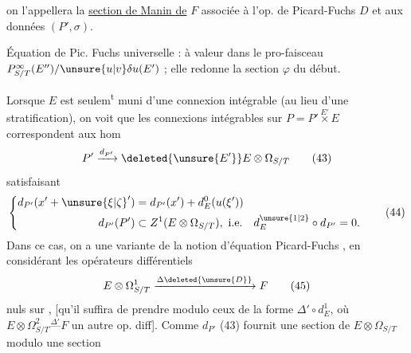 on l'appellera la \uline{section de Manin de} $F$ associée à l'op. de Picard-Fuchs $D$ et aux données $(P',\sigma)$.

Équation de Pic. Fuchs universelle : à valeur dans le pro-faisceau $P^\infty_{S/T}(E'')/\unsure{u|v}\delta u(E')$ ; elle redonne la section $\varphi$ du début.

Lorsque $E$ est seulem\textsuperscript{t} muni d'une connexion intégrable   (au lieu d'une stratification), on voit que les connexions intégrables sur $P=P'\mathbin{\overset{E'}{\times}}E$ correspondent aux hom
\[
 P'\xrightarrow{d_{P'}}\deleted{\unsure{E'}}E\otimes\Omega_{S/T} \tag*{(43)}
\]
satisfaisant
\[
 \left\{\begin{aligned}
 d_{P'}(x'+{\unsure{\xi|\zeta}}')&=d_{P'}(x')+d^0_E(u(\xi'))\\
 d_{P'}(P')&\subset Z^1(E\otimes\Omega_{S/T}),\ \text{i.e.}\quad d^{\unsure{1|2}}_E\circ d_{P'}=0 .
 \end{aligned}\right. \tag*{(44)}
\]
Dans ce cas, on a une variante de la notion d'équation  Picard-Fuchs , en considérant les opérateurs différentiels
\[
 E\otimes\Omega^1_{S/T}\xrightarrow{\Delta\deleted{\unsure{D}}}F \tag*{(45)}
\]
nuls sur  ,  [qu'il suffira de prendre modulo ceux de la forme $\Delta'\circ d^1_E$,  où  $E\otimes\Omega^2_{S/T}\mathrel{\overset{\Delta'}{\text{---}}}F$ un autre op. diff]. Comme $d_{P'}$ (43) fournit  une section de $E\otimes\Omega_{S/T}$ modulo une section
